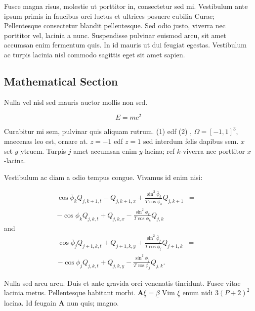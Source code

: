 \documentclass[a0,portrait]{a0poster}
\begin{document}
\begin{multicols}{2}
Fusce magna risus, molestie ut porttitor in, consectetur sed mi. Vestibulum ante ipsum primis in faucibus orci luctus et ultrices posuere cubilia Curae; Pellentesque consectetur blandit pellentesque. Sed odio justo, viverra nec porttitor vel, lacinia a nunc. Suspendisse pulvinar euismod arcu, sit amet accumsan enim fermentum quis. In id mauris ut dui feugiat egestas. Vestibulum ac turpis lacinia nisl commodo sagittis eget sit amet sapien.


\subsection*{Mathematical Section}

Nulla vel nisl sed mauris auctor mollis non sed.

\begin{equation}
E = mc^{2}
\label{eqn:Einstein}
\end{equation}

Curabitur mi sem, pulvinar quis aliquam rutrum. (1) edf (2)
, $\Omega=[-1,1]^3$, maecenas leo est, ornare at. $z=-1$ edf $z=1$ sed interdum felis dapibus sem. $x$ set $y$ ytruem.
Turpis $j$ amet accumsan enim $y$-lacina;
ref $k$-viverra nec porttitor $x$-lacina.

Vestibulum ac diam a odio tempus congue. Vivamus id enim nisi:

\begin{eqnarray}
\cos\bar{\phi}_k Q_{j,k+1,t} + Q_{j,k+1,x}+\frac{\sin^2\bar{\phi}_k}{T\cos\bar{\phi}_k} Q_{j,k+1} &=&\nonumber\\
-\cos\phi_k Q_{j,k,t} + Q_{j,k,x}-\frac{\sin^2\phi_k}{T\cos\phi_k} Q_{j,k}\label{edgek}
\end{eqnarray}
and
\begin{eqnarray}
\cos\bar{\phi}_j Q_{j+1,k,t} + Q_{j+1,k,y}+\frac{\sin^2\bar{\phi}_j}{T\cos\bar{\phi}_j} Q_{j+1,k}&=&\nonumber \\
-\cos\phi_j Q_{j,k,t} + Q_{j,k,y}-\frac{\sin^2\phi_j}{T\cos\phi_j} Q_{j,k}.\label{edgej}
\end{eqnarray}

Nulla sed arcu arcu. Duis et ante gravida orci venenatis tincidunt. Fusce vitae lacinia metus. Pellentesque habitant morbi. $\mathbf{A}\underline{\xi}=\underline{\beta}$ Vim $\underline{\xi}$ enum nidi $3(P+2)^{2}$ lacina. Id feugain $\mathbf{A}$ nun quis; magno.



\end{multicols}
\end{document}
